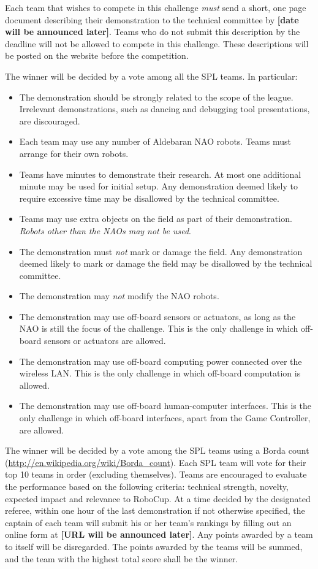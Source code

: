 \documentclass[12pt]{article}
\begin{document}
Each team that wishes to compete in this challenge \emph{must} send a 
short, one page document describing their demonstration to the technical 
committee by \textbf{[date will be announced later]}.  Teams who do not submit this description by 
the deadline will not be allowed to compete in this challenge. These 
descriptions will be posted on the website before the competition.

The winner will be decided by a vote among all the SPL teams. In particular:

\begin{itemize}
\item 
The demonstration should be strongly related to the scope of the league. 
Irrelevant demonstrations, such as dancing and debugging tool presentations, 
are discouraged.
\item 
Each team may use any number of Aldebaran NAO robots. Teams must arrange
for their own robots.
\item 
Teams have \openMinNum{} minutes to demonstrate their research. At most one 
additional minute may be used for initial setup. Any demonstration deemed
likely to require excessive time may be disallowed by the technical
committee.
\item 
Teams may use extra objects on the field as part of their
demonstration. \emph{Robots other than the NAOs may not be used}.
\item 
The demonstration must \emph{not} mark or damage the field. Any
demonstration deemed likely to mark or damage the field may be
disallowed by the technical committee.
\item
The demonstration may \emph{not} modify the NAO robots.
\item 
The demonstration may use off-board sensors or actuators, as long 
as the NAO is still the focus of the challenge.  This is the only 
challenge in which off-board sensors or actuators are allowed.
\item 
The demonstration may use off-board computing power connected over the
wireless LAN. This is the only challenge in which off-board
computation is allowed.
\item 
The demonstration may use off-board human-computer interfaces. This
is the only challenge in which off-board interfaces, apart from the
Game Controller, are allowed.
\end{itemize}

The winner will be decided by a vote among the SPL teams using a Borda
count (\url{http://en.wikipedia.org/wiki/Borda_count}). Each SPL 
team will vote for their top 10 teams in order (excluding themselves).
Teams are encouraged to evaluate the performance based on the
following criteria: technical strength, novelty, expected impact and
relevance to RoboCup. At a time decided by the designated referee,
within one hour of the last demonstration if not otherwise
specified, the captain of each team will submit his or her team's rankings 
by filling out an online form at \textbf{[URL will be announced later]}.  Any points 
awarded by a team to itself will be disregarded. The points awarded by the 
teams will be summed, and the team with the highest total score shall be the winner.
\end{document}
